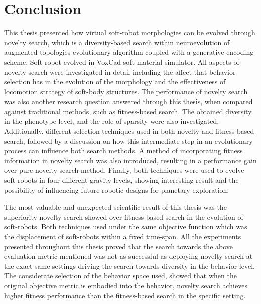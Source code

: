
\chapter{Conclusion} %

\label{Conclusion} %


This thesis presented how virtual soft-robot morphologies can be evolved through novelty search, which is a diversity-based search within neuroevolution of augmented topologies evolutionary algorithm coupled with a generative encoding scheme. Soft-robot evolved in VoxCad soft material simulator. All aspects of novelty search were investigated in detail including the affect that behavior selection has in the evolution of the morphology and the effectiveness of locomotion strategy of soft-body structures. The performance of novelty search was also another research question answered through this thesis, when compared against traditional methods, such as fitness-based search. The obtained diversity in the phenotype level, and the role of sparsity were also investigated. Additionally, different selection techniques used in both novelty and fitness-based search, followed by a discussion on how this intermediate step in an evolutionary process can influence both search methods. A method of incorporating fitness information in novelty search was also introduced, resulting in a performance gain over pure novelty search method. Finally, both techniques were used to evolve soft-robots in four different gravity levels, showing interesting result and the possibility of influencing future robotic designs for planetary exploration.

The most valuable and unexpected scientific result of this thesis was the superiority novelty-search showed over fitness-based search in the evolution of soft-robots. Both techniques used under the same objective function which was the displacement of soft-robots within a fixed time-span. All the experiments presented throughout this thesis proved that the search towards the above evaluation metric mentioned was not as successful as deploying novelty-search at the exact same settings driving the search towards diversity in the behavior level. The considerate selection of the behavior space used, showed that when the original objective metric is embodied into the behavior, novelty search achieves higher fitness performance than the fitness-based search in the specific setting.

\\

\\

\\

